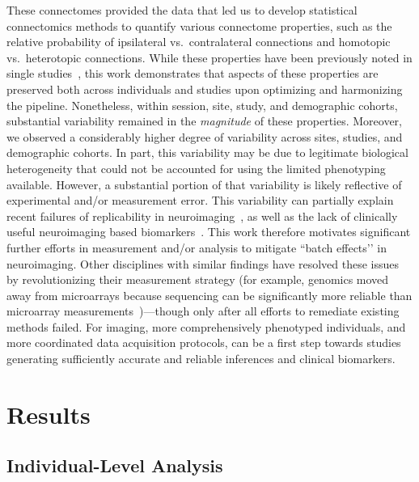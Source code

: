 \documentclass[11pt]{article}
\begin{document}
\begin{multicols}{2}
These connectomes provided the data that led us to develop statistical connectomics methods to quantify various connectome properties, such as the relative probability of ipsilateral vs.~contralateral connections and homotopic vs.~heterotopic connections. While these properties have been previously noted in single studies~\cite{Stark2008,Zuo2010,Gee2011}, this work demonstrates that aspects of these properties are preserved both across individuals and studies upon optimizing and harmonizing the pipeline. Nonetheless, within session, site, study, and demographic cohorts, substantial variability remained in the \emph{magnitude} of these properties. 
Moreover, we observed a considerably higher degree of variability across sites, studies, and demographic cohorts. In part, this variability may be due to legitimate biological heterogeneity that could not be accounted for using the limited phenotyping available. However, a substantial portion of that variability is likely reflective of experimental and/or measurement error.
This variability can partially explain recent failures of replicability in neuroimaging~\cite{Button2013}, as well as the lack of clinically useful neuroimaging based biomarkers~\cite{APA12}. This work therefore motivates significant further efforts in measurement and/or analysis to mitigate ``batch effects’’ in neuroimaging. 
Other disciplines with similar findings have resolved these issues by revolutionizing their measurement strategy (for example, genomics moved away from microarrays because sequencing can be significantly more reliable than microarray measurements~\cite{SEQCMAQC-III_Consortium2014-ij})---though only after all efforts to remediate existing methods failed. For imaging, more comprehensively phenotyped individuals, and more coordinated data acquisition protocols, can be a first step towards studies generating sufficiently accurate and reliable inferences and clinical biomarkers.





\section{Results}


\subsection{Individual-Level Analysis}




\end{multicols}
\end{document}
